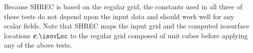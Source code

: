 Because SHREC is based on the regular grid,
the constants used in all three of these tests do not depend 
upon the input data and should work well for any scalar fields.
Note that SHREC maps the input grid 
and the computed isosurface locations $\cb.\isovLoc$
to the regular grid composed of unit cubes
before applying any of the above tests.

